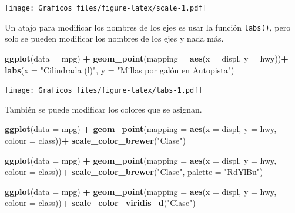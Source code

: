 \documentclass[]{book}
\newenvironment{Shaded}{\begin{snugshade}}{\end{snugshade}}
\newcommand{\DataTypeTok}[1]{\textcolor[rgb]{0.13,0.29,0.53}{#1}}
\newcommand{\KeywordTok}[1]{\textcolor[rgb]{0.13,0.29,0.53}{\textbf{#1}}}
\newcommand{\NormalTok}[1]{#1}
\newcommand{\OperatorTok}[1]{\textcolor[rgb]{0.81,0.36,0.00}{\textbf{#1}}}
\newcommand{\StringTok}[1]{\textcolor[rgb]{0.31,0.60,0.02}{#1}}
\theoremstyle{definition}
\theoremstyle{definition}
\theoremstyle{definition}
\theoremstyle{remark}
\begin{document}
\texttt{[image: Graficos\_files/figure-latex/scale-1.pdf]}

Un atajo para modificar los nombres de los ejes es usar la función
\texttt{labs()}, pero solo se pueden modificar los nombres de los ejes y
nada más.

\begin{Shaded}
\begin{Highlighting}[]
\KeywordTok{ggplot}\NormalTok{(}\DataTypeTok{data =}\NormalTok{ mpg) }\OperatorTok{+}
\StringTok{  }\KeywordTok{geom_point}\NormalTok{(}\DataTypeTok{mapping =} \KeywordTok{aes}\NormalTok{(}\DataTypeTok{x =}\NormalTok{ displ, }\DataTypeTok{y =}\NormalTok{ hwy))}\OperatorTok{+}
\StringTok{  }\KeywordTok{labs}\NormalTok{(}\DataTypeTok{x =} \StringTok{"Cilindrada (l)"}\NormalTok{, }\DataTypeTok{y =} \StringTok{"Millas por galón en Autopista"}\NormalTok{)}
\end{Highlighting}
\end{Shaded}

\texttt{[image: Graficos\_files/figure-latex/labs-1.pdf]}

También se puede modificar los colores que se asignan.

\begin{Shaded}
\begin{Highlighting}[]
\KeywordTok{ggplot}\NormalTok{(}\DataTypeTok{data =}\NormalTok{ mpg) }\OperatorTok{+}
\StringTok{  }\KeywordTok{geom_point}\NormalTok{(}\DataTypeTok{mapping =} \KeywordTok{aes}\NormalTok{(}\DataTypeTok{x =}\NormalTok{ displ, }\DataTypeTok{y =}\NormalTok{ hwy, }\DataTypeTok{colour =}\NormalTok{ class))}\OperatorTok{+}\StringTok{ }
\StringTok{  }\KeywordTok{scale_color_brewer}\NormalTok{(}\StringTok{"Clase"}\NormalTok{)}

\KeywordTok{ggplot}\NormalTok{(}\DataTypeTok{data =}\NormalTok{ mpg) }\OperatorTok{+}
\StringTok{  }\KeywordTok{geom_point}\NormalTok{(}\DataTypeTok{mapping =} \KeywordTok{aes}\NormalTok{(}\DataTypeTok{x =}\NormalTok{ displ, }\DataTypeTok{y =}\NormalTok{ hwy, }\DataTypeTok{colour =}\NormalTok{ class))}\OperatorTok{+}\StringTok{ }
\StringTok{  }\KeywordTok{scale_color_brewer}\NormalTok{(}\StringTok{"Clase"}\NormalTok{, }\DataTypeTok{palette =} \StringTok{"RdYlBu"}\NormalTok{)}

\KeywordTok{ggplot}\NormalTok{(}\DataTypeTok{data =}\NormalTok{ mpg) }\OperatorTok{+}
\StringTok{  }\KeywordTok{geom_point}\NormalTok{(}\DataTypeTok{mapping =} \KeywordTok{aes}\NormalTok{(}\DataTypeTok{x =}\NormalTok{ displ, }\DataTypeTok{y =}\NormalTok{ hwy, }\DataTypeTok{colour =}\NormalTok{ class))}\OperatorTok{+}\StringTok{ }
\StringTok{  }\KeywordTok{scale_color_viridis_d}\NormalTok{(}\StringTok{"Clase"}\NormalTok{)}
\end{Highlighting}
\end{Shaded}
\end{document}
